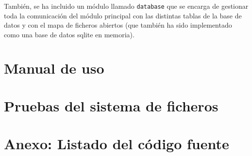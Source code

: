 \documentclass[12pt,a4paper]{article}
\begin{document}
También, se ha incluido un módulo llamado \texttt{\small database} que se encarga de gestionar toda la comunicación del módulo principal con las distintas tablas de la base de datos y con el mapa de ficheros abiertos (que también ha sido implementado como una base de datos sqlite en memoria).



\newpage
\section{Manual de uso}

\newpage
\section{Pruebas del sistema de ficheros}


\newpage
\section{Anexo: Listado del código fuente}

\iffalse 
\begin{figure}[h!]
  \centering
  \label{fig:supervisiontree}
  \texttt{[image: supervisiontree]}
  \caption{Árbol de supervisión}
\end{figure}
\fi


\iffalse
\lstdefinestyle{mystyle}{language=Pascal,
  breakatwhitespace=false,
  breaklines=true,
  basicstyle=\footnotesize
}
\begin{mycode}
1> application:start(otpapp).
Iniciado supervisor s1
Iniciado supervisor s2
Iniciado worker w2A 
Iniciado worker w2B 
Iniciado supervisor s3
Iniciado worker w3A 
Iniciado supervisor s5
Iniciado worker w5A 
Iniciado worker w5B 
Iniciado worker w5C 
Iniciado supervisor s4
Iniciado worker w4A 
Iniciado worker w4B 
ok
\end{mycode}
\fi
\end{document}
